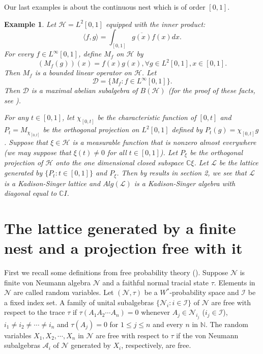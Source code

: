 \documentclass[12pt]{article}
\newtheorem{example}[theorem]{Example}
\def\H{{\mathscr{H} }}\def\L{{\mathscr{L}}}
\def\D{{\mathscr{D} }}
\def\NN{{\mathscr{ N}}}
\begin{document}
Our last examples is about the continuous nest which is of order
$[0, 1]$.

\noindent\begin{example} Let $\H=L^2[0,1]$ equipped with the inner
product: $$\langle f, g\rangle=\int_{[0, 1]}\overline{g(x)}f(x)dx.$$
For every $f\in L^{\infty}[0, 1]$, define $M_f$ on $\H$ by
$$(M_{f}(g))(x)=f(x)g(x), \forall g\in L^2[0, 1], x\in [0, 1].$$ Then $M_f$ is a
bounded linear operator on $\H$. Let $$\D=\{M_f: f\in L^{\infty}[0,
1]\}.$$ Then $\D$ is a maximal abelian subalgebra of $B(\H)$ (for
the proof of these facts, see \cite{KR}).

For any $t\in [0, 1]$, let $\chi_{[0, t]}$ be the characteristic
function of $[0, t]$ and $P_t=M_{\chi_{[0, t]}}$ be the orthogonal
projection on $L^2[0, 1]$ defined by $P_t(g)=\chi_{[0, t]}g$.
Suppose that $\xi\in \H$ is a measurable function that is nonzero
almost everywhere (we may suppose that $\xi(t)\neq 0$ for all $t\in
[0, 1]$). Let $P_{\xi}$ be the orthogonal projection of $\H$ onto
the one dimensional closed subspace $\mathbb{C}\xi$. Let
$\mathscr{L}$ be the lattice generated by $\{P_t: t\in [0, 1]\}$ and
$P_{\xi}$. Then by results in section 2, we see that $\L$ is a
Kadison-Singer lattice and $Alg(\L)$ is a Kadison-Singer algebra
with diagonal equal to $\mathbb{C}I$.
\end{example}






\section{The lattice generated by a finite nest and a projection free with it}

First we recall some definitions from free probability theory (\cite{VDN}).   Suppose $\NN$ is finite von Neumann
algebra $\NN$ and a faithful normal tracial state $\tau$.   Elements in $\NN$ are
called random variables. Let $(\mathscr{N}, \tau)$ be a $W^{\ast}$-probability space and $\mathcal{I}$ be a fixed index set. A family of unital
subalgebras $\{\mathscr{N}_i: i\in \mathcal I\}$ of $\mathscr{N}$
are free with respect to the trace $\tau$ if $\tau(A_1A_2\cdots
A_n)=0$ whenever $A_j\in \mathscr{N}_{i_j}$ ($i_j\in \mathcal{I}$), $i_1\neq i_2\neq \cdots
\neq i_n$ and $\tau(A_j)=0$ for $1\leq j\leq n$ and every $n$ in
$\mathbb{N}$. The random variables $X_1, X_2, \cdots, X_n$ in $\NN$
are free with respect to $\tau$ if the von Neumann subalgebras
$\mathscr{A}_i$ of $\NN$ generated by $X_i$, respectively, are
free.\newline
\end{document}
